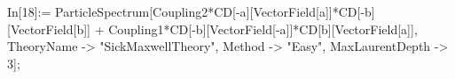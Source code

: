 In[18]:= ParticleSpectrum[Coupling2*CD[-a][VectorField[a]]*CD[-b][VectorField[b]] + Coupling1*CD[-b][VectorField[-a]]*CD[b][VectorField[a]], TheoryName -> "SickMaxwellTheory", Method -> "Easy", MaxLaurentDepth -> 3]; 
